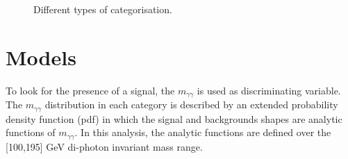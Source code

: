 \documentclass[a4paper, oneside, 11pt, openright]{book}
\begin{document}
 			\begin{figure}[h!]
 				\centering
 				\\
 				\\				
 				\caption{Different types of categorisation.}
 				\label{fig:Cats}
 			\end{figure}
 		\section{Models}
 			To look for the presence of a signal, the $m_{\gamma\gamma}$ is used as discriminating variable. The $m_{\gamma\gamma}$ distribution in each category is described by an extended probability density function (pdf) in which the signal and backgrounds shapes are analytic functions of $m_{\gamma\gamma}$. In this analysis, the analytic functions are defined over the [100,195] GeV di-photon invariant mass range. %
 			
\end{document}
